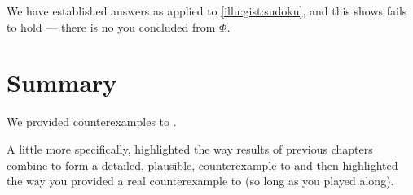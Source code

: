 \begin{note}
  We have established \fingfb{\sudokuRPV{}}{\(\Phi\)} answers \qWhy{} as applied to \autoref{illu:gist:sudoku}, and this \fingfr{} shows \issueInclusion{} fails to hold --- there is no  you concluded \sudokuRPV{} from \(\Phi\).
\end{note}



\section*{Summary}
\label{sec:summary-1}

\begin{note}
  We provided counterexamples to \issueInclusion{}.

  A little more specifically, highlighted the way results of previous chapters combine to form a detailed, plausible, counterexample to \issueInclusion{} and then highlighted the way you provided a real counterexample to \issueInclusion{} (so long as you played along).
\end{note}



